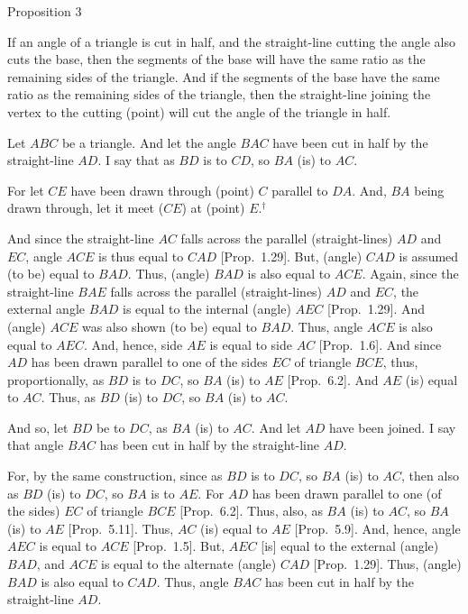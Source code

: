 
\begin{center}
{\large Proposition 3}
\end{center}

If an angle of a triangle is cut in half, and the
straight-line cutting the angle also cuts the base, then the segments of the base
will have the same ratio as the remaining sides of the triangle. And if
the segments of the base have the same ratio as the remaining sides of the
triangle, then the straight-line joining the vertex to the cutting (point) will
cut the angle of the triangle in half.

Let $ABC$ be a triangle. And let the angle $BAC$ have been cut in half
by the straight-line $AD$. I say that as $BD$ is to $CD$, so $BA$ (is) to $AC$.

For let $CE$ have been drawn through (point) $C$ parallel to $DA$.  And, $BA$ being drawn
through, let it meet ($CE$) at (point) $E$.$^\dag$

\epsfysize=2in
\centerline{}

And since the straight-line $AC$ falls across the parallel (straight-lines)
$AD$ and $EC$, angle $ACE$ is thus equal to $CAD$  [Prop.~1.29].
But, (angle) $CAD$ is assumed (to be) equal to $BAD$. Thus, (angle)
$BAD$ is also equal to $ACE$. Again, since the straight-line $BAE$ falls
across the parallel (straight-lines) $AD$ and $EC$, the external angle $BAD$
is equal to the internal (angle) $AEC$  [Prop.~1.29]. And (angle)
$ACE$ was also shown (to be) equal to $BAD$. Thus, angle $ACE$ is also
equal to $AEC$. And, hence, side $AE$ is equal to side $AC$  [Prop.~1.6].
And since $AD$ has been drawn parallel to one of the sides $EC$ of triangle
$BCE$, thus, proportionally, as $BD$ is to $DC$, so $BA$ (is) to $AE$ [Prop.~6.2]. And $AE$ (is) equal to $AC$.
Thus, as $BD$ (is) to $DC$, so $BA$ (is) to $AC$.

And so, let $BD$ be to $DC$,  as $BA$ (is) to
$AC$. And let $AD$ have been joined. I say that angle $BAC$ has been cut in
half by the straight-line $AD$.

For, by the same construction, since as $BD$ is to $DC$, so $BA$ (is) to
$AC$, then also as $BD$ (is) to $DC$, so $BA$ is to $AE$. For $AD$ has been drawn
parallel to one (of the sides) $EC$ of triangle $BCE$ [Prop.~6.2]. Thus, also, as $BA$ (is) to $AC$,
so $BA$ (is) to $AE$  [Prop.~5.11]. Thus,
$AC$ (is) equal to $AE$ [Prop.~5.9].
And, hence, angle $AEC$ is equal to $ACE$  [Prop.~1.5]. But, 
$AEC$ [is] equal to the external (angle) $BAD$, and $ACE$ is equal to the alternate
(angle) $CAD$  [Prop.~1.29]. Thus, (angle) $BAD$ is
also equal to $CAD$. Thus, angle $BAC$ has been cut in half by the
straight-line $AD$.

